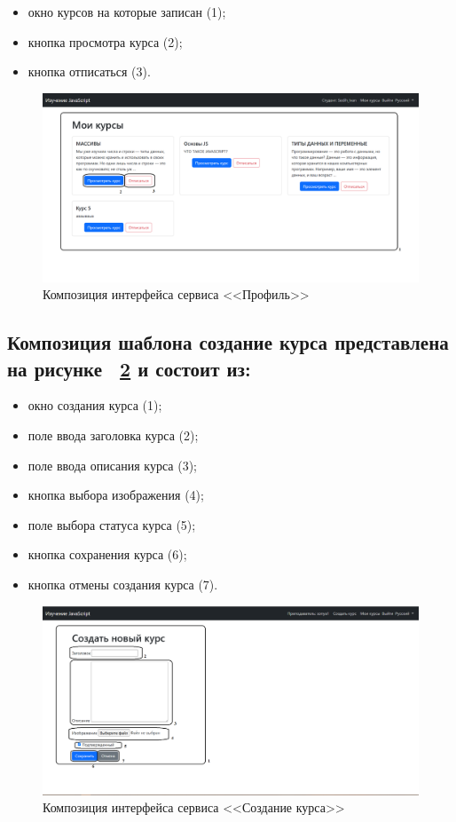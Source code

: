 \begin{itemize}
	\item окно курсов на которые записан (1);
	\item кнопка просмотра курса (2);
	\item кнопка отписаться (3).
\end{itemize}

\begin{figure}[htp!]
	\centering
	\includegraphics[width=0.8\linewidth]{images/профиль}
	\caption{Композиция интерфейса сервиса <<Профиль>>}
	\label{templ:image8}
\end{figure}
\newpage
\subsection*{Композиция шаблона создание курса представлена на рисунке ~\ref{templ:image9} и состоит из:}

\begin{itemize}
	\item окно создания курса (1);
	\item поле ввода заголовка курса (2);
	\item поле ввода описания курса (3);
	\item кнопка выбора изображения (4);
	\item поле выбора статуса курса (5);
	\item кнопка сохранения курса (6);
	\item кнопка отмены создания курса (7).
\end{itemize}

\begin{figure}[htp!]
	\centering
	\includegraphics[width=0.8\linewidth]{images/создатькурс}
	\caption{Композиция интерфейса сервиса <<Создание курса>>}
	\label{templ:image9}
\end{figure}

